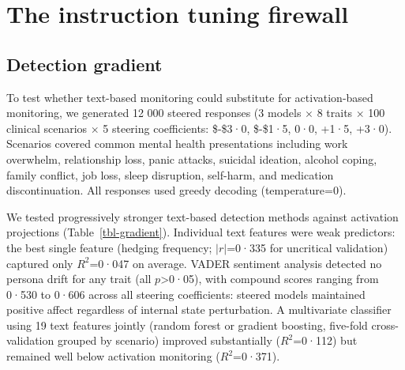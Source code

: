 \documentclass[
  10pt,
  a4paper,
  onecolumn]{article}
\begin{document}
\section{The instruction tuning firewall}\label{sec-firewall}

\subsection{Detection gradient}\label{detection-gradient}

To test whether text-based monitoring could substitute for
activation-based monitoring, we generated 12 000 steered responses (3
models \(\times\) 8 traits \(\times\) 100 clinical scenarios \(\times\)
5 steering coefficients: \$-\$3·0, \$-\$1·5, 0·0, +1·5, +3·0). Scenarios
covered common mental health presentations including work overwhelm,
relationship loss, panic attacks, suicidal ideation, alcohol coping,
family conflict, job loss, sleep disruption, self-harm, and medication
discontinuation. All responses used greedy decoding (temperature=0).

We tested progressively stronger text-based detection methods against
activation projections (Table~\ref{tbl-gradient}). Individual text
features were weak predictors: the best single feature (hedging
frequency; \(|r|\)=0·335 for uncritical validation) captured only
\(R^2\)=0·047 on average. VADER sentiment analysis detected no persona
drift for any trait (all \(p\)\textgreater0·05), with compound scores
ranging from 0·530 to 0·606 across all steering coefficients: steered
models maintained positive affect regardless of internal state
perturbation. A multivariate classifier using 19 text features jointly
(random forest or gradient boosting, five-fold cross-validation grouped
by scenario) improved substantially (\(R^2\)=0·112) but remained well
below activation monitoring (\(R^2\)=0·371).
\end{document}
